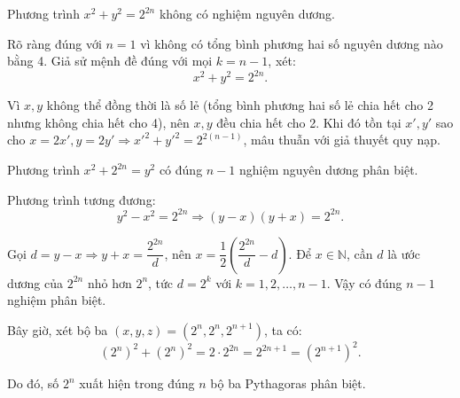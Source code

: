 \documentclass[../09-contruction-methods.tex]{subfiles}
\begin{document}
\begin{soln}\footnotemark
    \begin{theorem*}
        Phương trình \( x^2 + y^2 = 2^{2n} \) không có nghiệm nguyên dương.
    \end{theorem*}
    \begin{subproof}
        Rõ ràng đúng với \( n = 1 \) vì không có tổng bình phương hai số nguyên dương nào bằng 4. Giả sử mệnh đề đúng với mọi \( k = n - 1 \), xét:
        \[
            x^2 + y^2 = 2^{2n}.
        \]
        
        Vì \( x, y \) không thể đồng thời là số lẻ (tổng bình phương hai số lẻ chia hết cho 2 nhưng không chia hết cho 4), nên \( x, y \) đều chia hết cho 2.
        Khi đó tồn tại \( x', y' \) sao cho \( x = 2x', y = 2y' \Rightarrow x'^2 + y'^2 = 2^{2(n - 1)} \), mâu thuẫn với giả thuyết quy nạp.
    \end{subproof}

    \begin{theorem*}
        Phương trình \( x^2 + 2^{2n} = y^2 \) có đúng \( n - 1 \) nghiệm nguyên dương phân biệt.
    \end{theorem*}
    \begin{subproof}
        Phương trình tương đương:
        \[
            y^2 - x^2 = 2^{2n} \Rightarrow (y - x)(y + x) = 2^{2n}.
        \]
    
        Gọi \( d = y - x \Rightarrow y + x = \dfrac{2^{2n}}{d} \), nên \( x = \dfrac{1}{2}\left( \dfrac{2^{2n}}{d} - d \right) \).
        Để \( x \in \mathbb{N} \), cần \( d \) là ước dương của \( 2^{2n} \) nhỏ hơn \( 2^n \), tức \( d = 2^k \) với \( k = 1, 2, \dots, n - 1 \).
        Vậy có đúng \( n - 1 \) nghiệm phân biệt.
    \end{subproof}
    
    Bây giờ, xét bộ ba \( (x, y, z) = (2^n, 2^n, 2^{n+1}) \), ta có:
    \[
        (2^n)^2 + (2^n)^2 = 2 \cdot 2^{2n} = 2^{2n + 1} = (2^{n+1})^2.
    \]
    
    Do đó, số \( 2^{n} \) xuất hiện trong đúng \( n \) bộ ba Pythagoras phân biệt.    
\end{soln}

\end{document}

